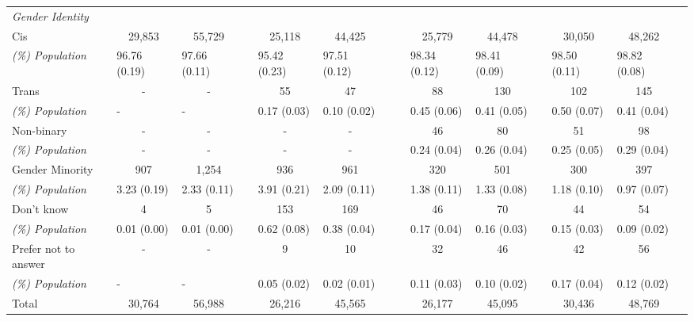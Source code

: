\begin{table}[htpb]
{\begin{tabular}{lcclccl|lcclccl}
\textit{Gender Identity} & \multicolumn{1}{l}{} & \multicolumn{1}{l}{} & & \multicolumn{1}{l}{} & \multicolumn{1}{l}{} & & & \multicolumn{1}{l}{} & \multicolumn{1}{l}{} & & \multicolumn{1}{l}{} & \multicolumn{1}{l}{} & \\
Cis & 29,853 & 55,729 & & 25,118 & 44,425 & & & 25,779 & 44,478 & & 30,050 & 48,262 & \\
\textit{(\%)  Population} & \multicolumn{1}{l}{96.76 (0.19)} & \multicolumn{1}{l}{97.66 (0.11)} & & \multicolumn{1}{l}{95.42 (0.23)} & \multicolumn{1}{l}{97.51 (0.12)} & & & \multicolumn{1}{l}{98.34 (0.12)} & \multicolumn{1}{l}{98.41 (0.09)} & & \multicolumn{1}{l}{98.50 (0.11)} & \multicolumn{1}{l}{98.82 (0.08)} & \\
Trans & - & - & & 55 & 47 & & & 88 & 130 & & 102 & 145 & \\
\textit{(\%)  Population} & \multicolumn{1}{l}{-} & \multicolumn{1}{l}{-} & & \multicolumn{1}{l}{0.17 (0.03)} & \multicolumn{1}{l}{0.10 (0.02)} & & & \multicolumn{1}{l}{0.45 (0.06)} & \multicolumn{1}{l}{0.41 (0.05)} & & \multicolumn{1}{l}{0.50 (0.07)} & \multicolumn{1}{l}{0.41 (0.04)} & \\
Non-binary & - & - & & - & - & & & 46 & 80 & & 51 & 98 & \\
\textit{(\%)  Population} & - & - & & - & - & & & \multicolumn{1}{l}{0.24 (0.04)} & \multicolumn{1}{l}{0.26 (0.04)} & & \multicolumn{1}{l}{0.25 (0.05)} & \multicolumn{1}{l}{0.29 (0.04)} & \\
Gender Minority & 907 & 1,254 & & 936 & 961 & & & 320 & 501 & & 300 & 397 & \\
\textit{(\%)  Population} & \multicolumn{1}{l}{3.23 (0.19)} & \multicolumn{1}{l}{2.33 (0.11)} & & \multicolumn{1}{l}{3.91 (0.21)} & \multicolumn{1}{l}{2.09 (0.11)} & & & \multicolumn{1}{l}{1.38 (0.11)} & \multicolumn{1}{l}{1.33 (0.08)} & & \multicolumn{1}{l}{1.18 (0.10)} & \multicolumn{1}{l}{0.97 (0.07)} & \\
Don't know & 4 & 5 & & 153 & 169 & & & 46 & 70 & & 44 & 54 & \\
\textit{(\%)  Population} & \multicolumn{1}{l}{0.01 (0.00)} & \multicolumn{1}{l}{0.01 (0.00)} & & \multicolumn{1}{l}{0.62 (0.08)} & \multicolumn{1}{l}{0.38 (0.04)} & & & \multicolumn{1}{l}{0.17 (0.04)} & \multicolumn{1}{l}{0.16 (0.03)} & & \multicolumn{1}{l}{0.15 (0.03)} & \multicolumn{1}{l}{0.09 (0.02)} & \\
Prefer not to answer & - & - & & 9 & 10 & & & 32 & 46 & & 42 & 56 & \\
\textit{(\%)  Population} & \multicolumn{1}{l}{-} & \multicolumn{1}{l}{-} & & \multicolumn{1}{l}{0.05 (0.02)} & \multicolumn{1}{l}{0.02 (0.01)} & & & \multicolumn{1}{l}{0.11 (0.03)} & \multicolumn{1}{l}{0.10 (0.02)} & & \multicolumn{1}{l}{0.17 (0.04)} & \multicolumn{1}{l}{0.12 (0.02)} & \\ \hline
Total & 30,764 & 56,988 & & 26,216 & 45,565 & & & 26,177 & 45,095 & & 30,436 & 48,769 & \\ \hline
\end{tabular}%
}


\end{table}
